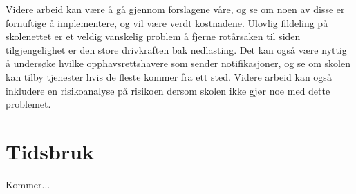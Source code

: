 Videre arbeid kan være å gå gjennom forslagene våre, og se om noen av disse er fornuftige å implementere, og vil være verdt kostnadene. Ulovlig fildeling på skolenettet er et veldig vanskelig problem å fjerne rotårsaken til siden tilgjengelighet er den store drivkraften bak nedlasting. Det kan også være nyttig å undersøke hvilke opphavsrettshavere som sender notifikasjoner, og se om skolen kan tilby tjenester hvis de fleste kommer fra ett sted. Videre arbeid kan også inkludere en risikoanalyse på risikoen dersom skolen ikke gjør noe med dette problemet.

\section{Tidsbruk}
Kommer...

